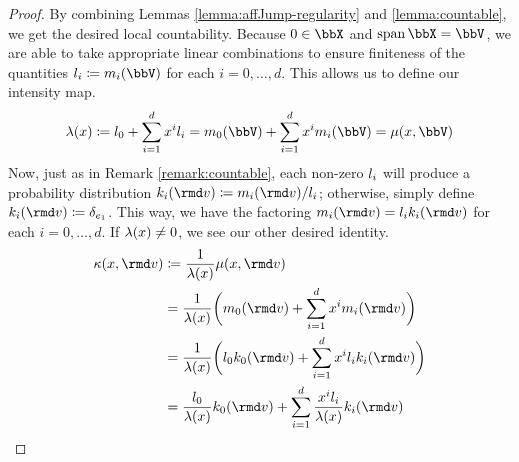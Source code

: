 \begin{proof}
  \label{proof:proposition:locally-countable}
  By combining Lemmas \ref{lemma:affJump-regularity} and \ref{lemma:countable}, we get the desired local countability.
  Because $0 \in \stateSpace$ and $\operatorname{span}\stateSpace = \vecSpace$, we are able to take appropriate linear combinations to ensure finiteness of the quantities $\affIntPart_i \defeq \affJumpPart_i(\vecSpace)$ for each $i = 0, \ldots, d$.
  This allows us to define our intensity map.
  \begin{equation*}
    \affInt(\stateVar) \defeq \affIntPart_0 + \sum_{i=1}^d \stateVar^i \affIntPart_i = \affJumpPart_0(\vecSpace) + \sum_{i=1}^d \stateVar^i \affJumpPart_i(\vecSpace) = \affJump(\stateVar, \vecSpace)
  \end{equation*}
  Now, just as in Remark \ref{remark:countable}, each non-zero $l_i$ will produce a probability distribution $\affDistPart_i(\rmd\markVar) \defeq \affJumpPart_i(\rmd\markVar) / \affIntPart_i$; otherwise, simply define $\affDistPart_i(\rmd\markVar) \defeq \delta_{\basisVec_1}$.
  This way, we have the factoring $\affJumpPart_i(\rmd\markVar) = \affIntPart_i\affDistPart_i(\rmd\markVar)$ for each $i = 0, \ldots, d$.
  If $\lambda(x) \neq 0$, we see our other desired identity.
  \begin{align*}
    \affDist(\stateVar, \rmd\markVar) 
    &\defeq \frac{1}{\affInt(\stateVar)} \affJump(\stateVar, \rmd\markVar) \\
    &= \frac{1}{\affInt(\stateVar)} \bigg( \affJumpPart_0(\rmd\markVar) + \sum_{i=1}^d \stateVar^i \affJumpPart_i(\rmd\markVar) \bigg) \\
    &= \frac{1}{\affInt(\stateVar)} \bigg( \affIntPart_0 \affDistPart_0(\rmd\markVar) + \sum_{i=1}^d \stateVar^i \affIntPart_i \affDistPart_i(\rmd\markVar) \bigg) \\
    &= \frac{\affIntPart_0}{\affInt(\stateVar)} \affDistPart_0(\rmd\markVar) + \sum_{i=1}^d \frac{\stateVar^i\affIntPart_i}{\affInt(\stateVar)} \affDistPart_i(\rmd\markVar) 
  \end{align*}
\end{proof}
